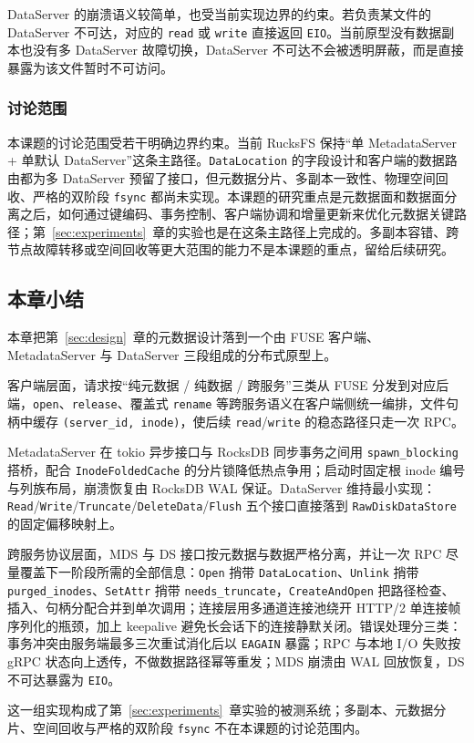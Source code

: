 DataServer 的崩溃语义较简单，也受当前实现边界的约束。若负责某文件的 DataServer 不可达，对应的 \texttt{read} 或 \texttt{write} 直接返回 \texttt{EIO}。当前原型没有数据副本也没有多 DataServer 故障切换，DataServer 不可达不会被透明屏蔽，而是直接暴露为该文件暂时不可访问。

\subsubsection{讨论范围}

本课题的讨论范围受若干明确边界约束。当前 RucksFS 保持“单 MetadataServer + 单默认 DataServer”这条主路径。\texttt{DataLocation} 的字段设计和客户端的数据路由都为多 DataServer 预留了接口，但元数据分片、多副本一致性、物理空间回收、严格的双阶段 \texttt{fsync} 都尚未实现。本课题的研究重点是元数据面和数据面分离之后，如何通过键编码、事务控制、客户端协调和增量更新来优化元数据关键路径；第~\ref{sec:experiments}~章的实验也是在这条主路径上完成的。多副本容错、跨节点故障转移或空间回收等更大范围的能力不是本课题的重点，留给后续研究。

\subsection{本章小结}

本章把第~\ref{sec:design}~章的元数据设计落到一个由 FUSE 客户端、MetadataServer 与 DataServer 三段组成的分布式原型上。

客户端层面，请求按“纯元数据 / 纯数据 / 跨服务”三类从 FUSE 分发到对应后端，\texttt{open}、\texttt{release}、覆盖式 \texttt{rename} 等跨服务语义在客户端侧统一编排，文件句柄中缓存 \texttt{(server\_id, inode)}，使后续 \texttt{read}/\texttt{write} 的稳态路径只走一次 RPC。

MetadataServer 在 tokio 异步接口与 RocksDB 同步事务之间用 \texttt{spawn\_blocking} 搭桥，配合 \texttt{InodeFoldedCache} 的分片锁降低热点争用；启动时固定根 inode 编号与列族布局，崩溃恢复由 RocksDB WAL 保证。DataServer 维持最小实现：\texttt{Read}/\texttt{Write}/\texttt{Truncate}/\texttt{DeleteData}/\texttt{Flush} 五个接口直接落到 \texttt{RawDiskDataStore} 的固定偏移映射上。

跨服务协议层面，MDS 与 DS 接口按元数据与数据严格分离，并让一次 RPC 尽量覆盖下一阶段所需的全部信息：\texttt{Open} 捎带 \texttt{DataLocation}、\texttt{Unlink} 捎带 \texttt{purged\_inodes}、\texttt{SetAttr} 捎带 \texttt{needs\_truncate}，\texttt{CreateAndOpen} 把路径检查、插入、句柄分配合并到单次调用；连接层用多通道连接池绕开 HTTP/2 单连接帧序列化的瓶颈，加上 keepalive 避免长会话下的连接静默关闭。错误处理分三类：事务冲突由服务端最多三次重试消化后以 \texttt{EAGAIN} 暴露；RPC 与本地 I/O 失败按 gRPC 状态向上透传，不做数据路径幂等重发；MDS 崩溃由 WAL 回放恢复，DS 不可达暴露为 \texttt{EIO}。

这一组实现构成了第~\ref{sec:experiments}~章实验的被测系统；多副本、元数据分片、空间回收与严格的双阶段 \texttt{fsync} 不在本课题的讨论范围内。
